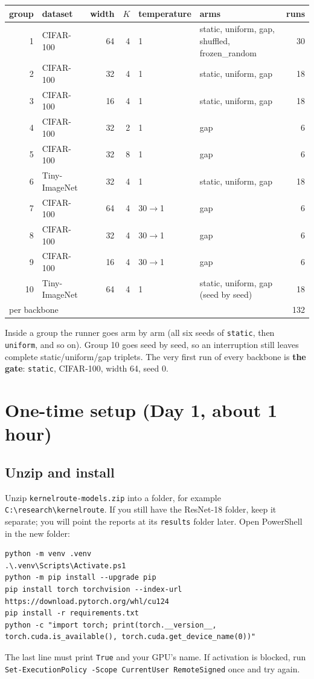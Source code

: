 \documentclass[10.5pt,a4paper]{article}
\newcommand{\cmd}[1]{\texttt{#1}}
\begin{document}
\begin{center}\small
\begin{tabular}{r l r r l l r}
\toprule
group & dataset & width & $K$ & temperature & arms & runs \\
\midrule
1 & CIFAR-100 & 64 & 4 & 1 & static, uniform, gap, shuffled, frozen\_random & 30 \\
2 & CIFAR-100 & 32 & 4 & 1 & static, uniform, gap & 18 \\
3 & CIFAR-100 & 16 & 4 & 1 & static, uniform, gap & 18 \\
4 & CIFAR-100 & 32 & 2 & 1 & gap & 6 \\
5 & CIFAR-100 & 32 & 8 & 1 & gap & 6 \\
6 & Tiny-ImageNet & 32 & 4 & 1 & static, uniform, gap & 18 \\
7 & CIFAR-100 & 64 & 4 & 30$\to$1 & gap & 6 \\
8 & CIFAR-100 & 32 & 4 & 30$\to$1 & gap & 6 \\
9 & CIFAR-100 & 16 & 4 & 30$\to$1 & gap & 6 \\
10 & Tiny-ImageNet & 64 & 4 & 1 & static, uniform, gap (seed by seed) & 18 \\
\midrule
\multicolumn{6}{l}{per backbone} & 132 \\
\bottomrule
\end{tabular}
\end{center}

Inside a group the runner goes arm by arm (all six seeds of \cmd{static}, then \cmd{uniform}, and so on). Group 10 goes seed by seed, so an interruption still leaves complete static/uniform/gap triplets. The very first run of every backbone is \textbf{the gate}: \cmd{static}, CIFAR-100, width 64, seed 0.

\section{One-time setup (Day 1, about 1 hour)}\label{sec:setup}

\subsection{Unzip and install}
Unzip \cmd{kernelroute-models.zip} into a folder, for example \cmd{C:\textbackslash research\textbackslash kernelroute}. If you still have the ResNet-18 folder, keep it separate; you will point the reports at its \cmd{results} folder later. Open PowerShell in the new folder:
\begin{lstlisting}
python -m venv .venv
.\.venv\Scripts\Activate.ps1
python -m pip install --upgrade pip
pip install torch torchvision --index-url https://download.pytorch.org/whl/cu124
pip install -r requirements.txt
python -c "import torch; print(torch.__version__, torch.cuda.is_available(), torch.cuda.get_device_name(0))"
\end{lstlisting}
The last line must print \cmd{True} and your GPU's name. If activation is blocked, run \cmd{Set-ExecutionPolicy -Scope CurrentUser RemoteSigned} once and try again.
\end{document}
